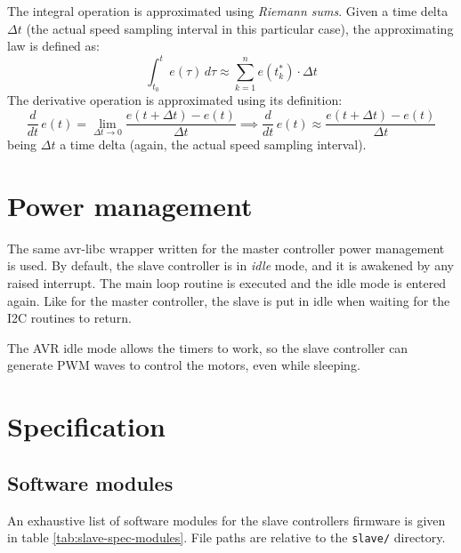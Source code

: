 \documentclass[binding=0.6cm,Lau]{sapthesis}
\begin{document}
The integral operation is approximated using \emph{Riemann sums}. Given a time
delta $\Delta t$ (the actual speed sampling interval in this particular case),
the approximating law is defined as:
\begin{equation}
  \int_{t_0}^t e(\tau)\,d\tau \approx \sum_{k=1}^n e(t_k^*) \cdot \Delta t
\end{equation}
The derivative operation is approximated using its
definition\cite{levy-num-analysis}:
\begin{equation}
  \frac{d}{dt}\,e(t) = \lim_{\Delta t \to 0} \frac{e(t + \Delta t) - e(t)}{\Delta t} \implies
  \frac{d}{dt}\,e(t) \approx \frac{e(t + \Delta t) - e(t)}{\Delta t}
\end{equation}
being $\Delta t$ a time delta (again, the actual speed sampling interval).

\section{Power management}
The same avr-libc wrapper written for the master controller power management is
used.
By default, the slave controller is in \emph{idle} mode, and it is awakened by
any raised interrupt. The main loop routine is executed and the idle mode is
entered again. Like for the master controller, the slave is put in idle when
waiting for the I2C routines to return.

The AVR idle mode allows the timers to work, so the slave controller can
generate PWM waves to control the motors, even while sleeping.

\section{Specification}

\subsection{Software modules}
An exhaustive list of software modules for the slave controllers firmware is
given in table \ref{tab:slave-spec-modules}. File paths are relative to the
\texttt{slave/} directory.
\end{document}
